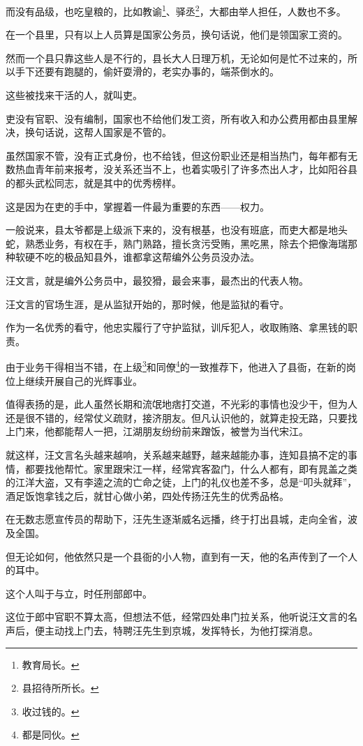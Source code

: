 \begin{multicols}{\theparacolNo}
而没有品级，也吃皇粮的，比如教谕\footnote{教育局长。}、驿丞\footnote{县招待所所长。}，大都由举人担任，人数也不多。

在一个县里，只有以上人员算是国家公务员，换句话说，他们是领国家工资的。

然而一个县只靠这些人是不行的，县长大人日理万机，无论如何是忙不过来的，所以手下还要有跑腿的，偷奸耍滑的，老实办事的，端茶倒水的。

这些被找来干活的人，就叫吏。

吏没有官职、没有编制，国家也不给他们发工资，所有收入和办公费用都由县里解决，换句话说，这帮人国家是不管的。

虽然国家不管，没有正式身份，也不给钱，但这份职业还是相当热门，每年都有无数热血青年前来报考，没关系还当不上，也着实吸引了许多杰出人才，比如阳谷县的都头武松同志，就是其中的优秀榜样。

这是因为在吏的手中，掌握着一件最为重要的东西——权力。

一般说来，县太爷都是上级派下来的，没有根基，也没有班底，而吏大都是地头蛇，熟悉业务，有权在手，熟门熟路，擅长贪污受贿，黑吃黑，除去个把像海瑞那种软硬不吃的极品知县外，谁都拿这帮编外公务员没办法。

汪文言，就是编外公务员中，最狡猾，最会来事，最杰出的代表人物。

汪文言的官场生涯，是从监狱开始的，那时候，他是监狱的看守。

作为一名优秀的看守，他忠实履行了守护监狱，训斥犯人，收取贿赂、拿黑钱的职责。

由于业务干得相当不错，在上级\footnote{收过钱的。}和同僚\footnote{都是同伙。}的一致推荐下，他进入了县衙，在新的岗位上继续开展自己的光辉事业。

值得表扬的是，此人虽然长期和流氓地痞打交道，不光彩的事情也没少干，但为人还是很不错的，经常仗义疏财，接济朋友。但凡认识他的，就算走投无路，只要找上门来，他都能帮人一把，江湖朋友纷纷前来蹭饭，被誉为当代宋江。

就这样，汪文言名头越来越响，关系越来越野，越来越能办事，连知县搞不定的事情，都要找他帮忙。家里跟宋江一样，经常宾客盈门，什么人都有，即有晁盖之类的江洋大盗，又有李逵之流的亡命之徒，上门的礼仪也差不多，总是“叩头就拜”，酒足饭饱拿钱之后，就甘心做小弟，四处传扬汪先生的优秀品格。

在无数志愿宣传员的帮助下，汪先生逐渐威名远播，终于打出县城，走向全省，波及全国。

但无论如何，他依然只是一个县衙的小人物，直到有一天，他的名声传到了一个人的耳中。

这个人叫于与立，时任刑部郎中。

这位于郎中官职不算太高，但想法不低，经常四处串门拉关系，他听说汪文言的名声后，便主动找上门去，特聘汪先生到京城，发挥特长，为他打探消息。


\end{multicols}
